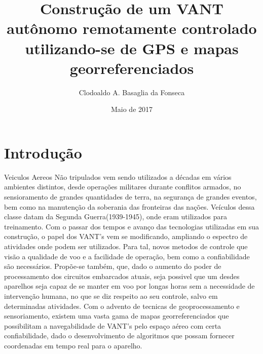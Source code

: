 \documentclass{article}
\title{Construção de um VANT autônomo remotamente controlado utilizando-se de GPS e mapas georreferenciados}
\author{Clodoaldo A. Basaglia da Fonseca }
\date{Maio de 2017}
\begin{document}
\maketitle

\section{Introdução}
Veiculos Aereos Não tripulados vem sendo utilizados a décadas em vários ambientes distintos, desde operações militares durante conflitos armados, no sensioramento de grandes quantidades de terra, na segurança de grandes eventos, bem como na manutenção da soberania das fronteiras das nações. Veículos dessa classe datam da Segunda Guerra(1939-1945), onde eram utilizados para treinamento. Com o passar dos tempos e avanço das tecnologias utilizadas em sua construção, o papel dos VANT's vem se modificando, ampliando o espectro de atividades onde podem ser utilizados. Para tal, novos metodos de controle que visão a qualidade de voo e a facilidade de operação, bem como a confiabilidade são necessários. Propõe-se também, que, dado o aumento do poder de processamento dos circuitos embarcados atuais, seja possivel que um desdes aparelhos seja capaz de se manter em voo por longas horas sem a necessidade de intervenção humana, no que se diz respeito ao seu controle, salvo em determinadas atividades. Com o advento de tecnicas de geoprocessamento e sensoriamento, existem uma vasta gama de mapas georreferenciados que possibilitam a navegabilidade de VANT's pelo espaço aéreo com certa confiabilidade, dado o desenvolvimento de algoritmos que possam fornecer coordenadas em tempo real para o aparelho.
\end{document}

